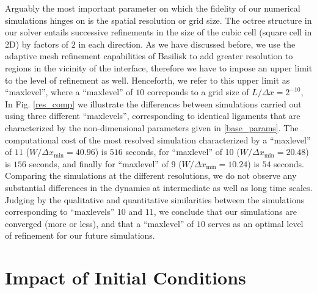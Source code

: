 Arguably the most important parameter on which the fidelity of our
numerical simulations hinges on is the spatial resolution or grid size. 
The octree structure in our solver entails successive refinements in the  
size of the cubic cell (square cell in 2D) by factors of $2$ in each direction.
As we have discussed before, we use the adaptive mesh refinement capabilities 
of Basilisk to add greater resolution to regions in the vicinity of the interface, 
therefore we have to impose an upper limit to the level of refinement as well. 
Henceforth, we refer to this upper limit as ``maxlevel'', 
where a ``maxlevel'' of $10$ correponds to a grid size of $L/ \Delta x = 2^{-10}$,  
In Fig. \ref{res_comp} we illustrate the differences between simulations carried out
using three different ``maxlevels'', corresponding to identical ligaments that
are characterized by the non-dimensional parameters given in \eqref{base_params}.
The computational cost of the most resolved simulation characterized by a ``maxlevel''
of $11$ ($W / \Delta x_{\textrm{min}} = 40.96$) is $516$ seconds, 
for ``maxlevel'' of 10 ($W / \Delta x_{\textrm{min}} = 20.48$) is $156$ seconds, and finally 
for ``maxlevel'' of 9 ($W / \Delta x_{\textrm{min}} = 10.24$) is $54$ seconds. 
Comparing the simulations at the different resolutions, we do not observe any substantial 
differences in the dynamics at intermediate as well as long time scales.
Judging by the qualitative and quantitative similarities between the simulations corresponding 
to ``maxlevels'' $10$ and $11$, we conclude that our simulations are converged (more or less),
and that a ``maxlevel'' of $10$ serves as an optimal level of refinement for our future simulations.  


\section{Impact of Initial Conditions}

